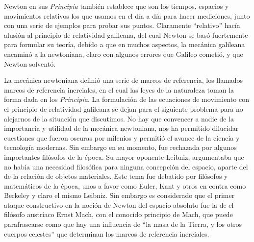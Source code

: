 \documentclass[a4paper,10pt]{article}
\numberwithin{equation}{section}
\begin{document}
\vspace{.3cm} 

Newton en sus \emph{Principia} también establece que son los tiempos, espacios y movimientos 
relativos los que usamos en el día a día para hacer mediciones, junto con una serie de 
ejemplos para probar sus puntos. Claramente ``relativo'' hacía alusión al principio de
relatividad galileana, del cual Newton se basó fuertemente para formular su teoría, debido
a que en muchos aspectos, la mecánica galileana encaminó a la newtoniana, claro con algunos
errores que Galileo cometió, y que Newton solventó.

\vspace{.3cm}

La mecánica newtoniana definió una serie de marcos de referencia, los llamados marcos 
de referencia inerciales, en el cual las leyes de la naturaleza toman la forma dada en 
los \emph{Principia}. La formulación de las ecuaciones de movimiento con el principio de 
relatividad galileana se dejan para el siguiente problema para no alejarnos de la situación
que discutimos. No hay que convencer a nadie de la importancia y utilidad de la mecánica
newtoniana, nos ha permitido dilucidar cuestiones que fueron oscuras por milenios y 
permitió el avance de la ciencia y tecnología modernas. Sin embargo en su momento, fue rechazada
por algunos importantes filósofos de la época. Su mayor oponente Leibniz, argumentaba 
que no había una necesidad filosófica para ninguna concepción del espacio, aparte del de 
la relación de objetos materiales. Este tema fue debatido por filósofos y matemáticos 
de la época, unos a favor como Euler, Kant y otros en contra como Berkeley y claro el mismo
Leibniz. Sin embargo es considerado que el primer ataque constructivo en la noción
de Newton del espacio absoluto fue la de el filósofo austríaco Ernst Mach, con el 
conocido principio de Mach, que puede parafrasearse como  que hay una influencia de 
``la masa de la Tierra, y los otros cuerpos celestes'' que determinan los marcos de referencia
inerciales. 

\vspace{.3cm}
\end{document}
